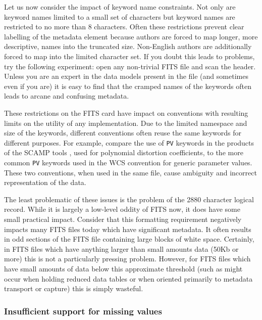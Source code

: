 \documentclass[final,authoryear,5p,times,twocolumn]{elsarticle}
\begin{document}
{{Let us now consider the impact of keyword name constraints. Not only
are keyword names limited to a small set of characters but keyword
names are restricted to no more than 8 characters. Often these
restrictions prevent clear labelling of the metadata element because
authors are forced to map longer, more descriptive, names into the
truncated size. Non-English authors are additionally forced to map
into the limited character set. If you doubt this leads to problems,
try the following experiment: open any non-trivial FITS file and scan
the header. Unless you are an expert in the data models present in the
file (and sometimes even if you are) it is easy to find that the
cramped names of the keywords often leads to arcane and confusing
metadata.


These restrictions on the FITS card have impact on conventions with
resulting limits on the utility of any implementation. Due to the limited 
namespace and size of the keywords, different conventions often reuse 
the same keywords for different purposes.  For example, compare the use 
of \texttt{PV} keywords in the products of the SCAMP tools
\citep{2006ASPC..351..112B}, used for polynomial distortion coefficients, 
to the more common \texttt{PV} keywords used in the WCS convention for generic
parameter values. These two conventions, when used in the same file,
cause ambiguity and incorrect representation of the data.


The least problematic of these issues is the problem of the 2880
character logical record. While
it is largely a low-level oddity of FITS now, it does have some small
practical impact. Consider that this formatting requirement negatively
impacts many FITS files today which have significant metadata. It
often results in odd sections of the FITS file containing large blocks
of white space. Certainly, in FITS files which have anything larger than
small amounts data (50Kb or more) this is not a particularly pressing
problem. However, for FITS files which have small amounts of data
below this approximate threshold (such as might occur when holding 
reduced data tables or when oriented primarily to metadata transport or 
capture) this is simply wasteful.

\subsubsection{Insufficient support for missing values}

}}
\end{document}
